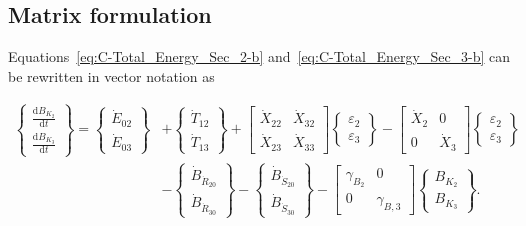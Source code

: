\subsection{Matrix formulation} %
\label{sec:C-matrix}

Equations~\ref{eq:C-Total_Energy_Sec_2-b} 
and~\ref{eq:C-Total_Energy_Sec_3-b} can be rewritten 
in vector notation as

\begin{equation} \label{eq:C-Expanded_Matrix_Form}
	\begin{split}
		\begin{Bmatrix}
			\frac{\mathrm{d}B_{K_{2}}}{\mathrm{d}t} \\[0.4em] %
			\frac{\mathrm{d}B_{K_{3}}}{\mathrm{d}t} 
		\end{Bmatrix}
		=
		\begin{Bmatrix}
			\dot{E}_{02}\\
			\dot{E}_{03}
		\end{Bmatrix}
		& +                                               %
		\begin{Bmatrix}
			\dot{T}_{12}\\
			\dot{T}_{13}
		\end{Bmatrix}
		+
		\begin{bmatrix}
			\dot{X}_{22} & \dot{X}_{32}\\
			\dot{X}_{23} & \dot{X}_{33}
		\end{bmatrix}
		\begin{Bmatrix}
			\varepsilon_{2}\\
			\varepsilon_{3}
		\end{Bmatrix}   
		- 
		\begin{bmatrix}
			\dot{X}_{2} & 0          \\
			0           & \dot{X}_{3}
		\end{bmatrix}
		\begin{Bmatrix}
			\varepsilon_{2}\\
			\varepsilon_{3}
		\end{Bmatrix} \\                                 %
		& -                                              %
		\begin{Bmatrix}
			\dot{B}_{\dot{R}_{20}}  \\
			\dot{B}_{\dot{R}_{30}} 
		\end{Bmatrix}
		-
		\begin{Bmatrix}
			\dot{B}_{\dot{S}_{20}}  \\
			\dot{B}_{\dot{S}_{30}} 
		\end{Bmatrix}
		-
		\begin{bmatrix}
			\gamma_{B_{2}} & 0          \\
			0            & \gamma_{B,3}
		\end{bmatrix}
		\begin{Bmatrix}
			B_{K_{2}}\\
			B_{K_{3}}
		\end{Bmatrix}.
	\end{split}
\end{equation}


